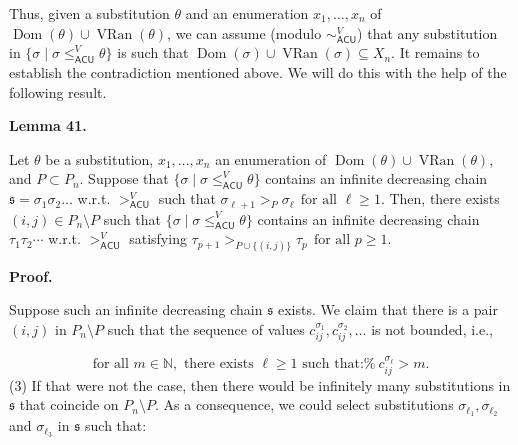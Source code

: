  
Thus, given a substitution $\theta$ and an enumeration $x_{1},\ldots,x_{n}$ of $\operatorname{Dom}(\theta)\cup\operatorname{VRan}(\theta)$, we can assume (modulo $\sim_{\mathsf{ACU}}^{V}$) that any substitution in $\{\sigma\mid\sigma\leq_{\mathsf{ACU}}^{V}\theta\}$ is such that $\operatorname{Dom}(\sigma)\cup\operatorname{VRan}(\sigma)\subseteq X_{n}$. It remains to establish the contradiction mentioned above. We will do this with the help of the following result.\par
 
 
 
\par\medskip\noindent\textbf{Lemma 41.}\par
 
 
Let $\theta$ be a substitution, $x_{1},\ldots,x_{n}$ an enumeration of $\operatorname{Dom}(\theta)\cup\operatorname{VRan}(\theta)$, and $P\subset P_{n}$. Suppose that $\{\sigma\mid\sigma\leq_{\mathsf{ACU}}^{V}\theta\}$ contains an infinite decreasing chain $\mathfrak{s}=\sigma_{1}\sigma_{2}\ldots$ w.r.t. $>_{\mathsf{ACU}}^{V}$ such that $\sigma_{\ell+1}>_{P}\sigma_{\ell}\ \ \mbox{for all }\ell\geq 1.$ Then, there exists $(i,j)\in P_{n}\setminus P$ such that $\{\sigma\mid\sigma\leq_{\mathsf{ACU}}^{V}\theta\}$ contains an infinite decreasing chain $\tau_{1}\tau_{2}\cdots$ w.r.t. $>_{\mathsf{ACU}}^{V}$ satisfying $\tau_{p+1}>_{P\cup\{(i,j)\}}\tau_{p}\ \ \mbox{for all }p\geq 1.$\par
 
 
 
 
 
\par\medskip\noindent\textbf{Proof.}\par
 
 
Suppose such an infinite decreasing chain $\mathfrak{s}$ exists. We claim that there is a pair $(i,j)$ in $P_{n}\setminus P$ such that the sequence of values $c^{\sigma_{1}}_{ij},c^{\sigma_{2}}_{ij},\ldots$ is not bounded, i.e.,\par
    \[\text{for all }m\in\mathbb{N},\text{ there exists }\ell\geq 1\text{ such that:%
}\ c^{\sigma_{\ell}}_{ij}>m.\]  (3)   
If that were not the case, then there would be infinitely many substitutions in $\mathfrak{s}$ that coincide on $P_{n}\setminus P$. As a consequence, we could select substitutions $\sigma_{\ell_{1}},\sigma_{\ell_{2}}$ and $\sigma_{\ell_{3}}$ in $\mathfrak{s}$ such that:\par
  
